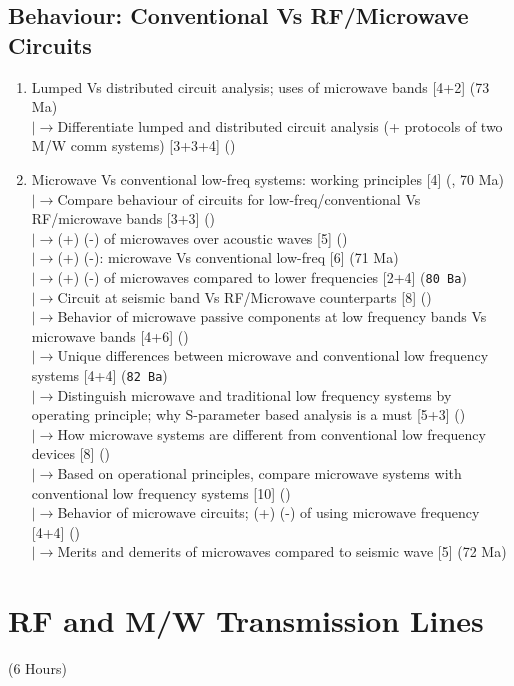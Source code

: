 \documentclass[12pt]{article}
\newcommand{\lb}{\\$\left|\rightarrow\right.$}
\begin{document}
  \subsection{Behaviour: Conventional Vs RF/Microwave Circuits}
    \begin{enumerate}[topsep=0pt, noitemsep]
      \item Lumped Vs distributed circuit analysis; uses of microwave bands \hfill [4+2] (73 Ma)
        \lb Differentiate lumped and distributed circuit analysis (+ protocols of two M/W comm systems) \hfill [3+3+4] ()
      \item Microwave Vs conventional low-freq systems: working principles \hfill [4] (, 70 Ma)
        \lb Compare behaviour of circuits for low-freq/conventional Vs RF/microwave bands \hfill [3+3] ()
        \lb (+) (-) of microwaves over acoustic waves \hfill [5] ()
        \lb (+) (-): microwave Vs conventional low-freq \hfill [6] (71 Ma)
        \lb (+) (-) of microwaves compared to lower frequencies \hfill [2+4] (\texttt{80 Ba})
        \lb Circuit at seismic band Vs RF/Microwave counterparts \hfill [8] ()
        \lb Behavior of microwave passive components at low frequency bands Vs microwave bands \hfill [4+6] ()
        \lb Unique differences between microwave and conventional low frequency systems \hfill [4+4] (\texttt{82 Ba})
        \lb Distinguish microwave and traditional low frequency systems by operating principle; why S-parameter based analysis is a must \hfill [5+3] ()
        \lb How microwave systems are different from conventional low frequency devices \hfill [8] ()
        \lb Based on operational principles, compare microwave systems with conventional low frequency systems \hfill [10] ()
        \lb Behavior of microwave circuits; (+) (-) of using microwave frequency \hfill [4+4] ()
        \lb Merits and demerits of microwaves compared to seismic wave \hfill [5] (72 Ma)
    \end{enumerate}

\pagebreak
\section{RF and M/W Transmission Lines}
\begin{center}(6 Hours)\end{center}
\end{document}
